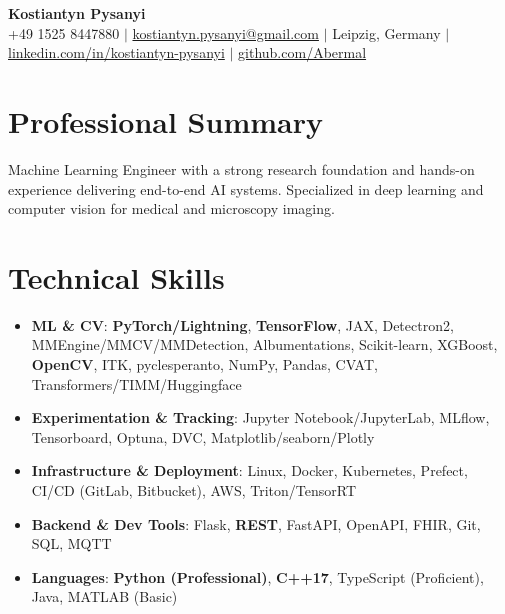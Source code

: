 \documentclass[letterpaper,10pt]{article}
\newcommand{\resumeItem}[1]{
    \item\small{#1}\vspace{-0.5pt}
}
\newcommand{\resumeSubHeadingList}{\begin{itemize}[leftmargin=0.15in, label={}]\vspace{-2pt}}
\newcommand{\resumeSubHeadingListEnd}{\end{itemize}}
\begin{document}
\begin{center}
  \textbf{\Huge Kostiantyn Pysanyi}\vspace{4pt} \\
  \small +49 1525 8447880 $|$ \href{mailto:kostiantyn.pysanyi@gmail.com}{kostiantyn.pysanyi@gmail.com} $|$ Leipzig, Germany $|$
  \href{https://www.linkedin.com/in/kostiantyn-pysanyi/}{linkedin.com/in/kostiantyn-pysanyi} $|$ \href{https://github.com/Abermal}{github.com/Abermal}
\end{center}


\section{Professional Summary}
Machine Learning Engineer with a strong research foundation and hands-on experience delivering end-to-end AI systems. Specialized in deep learning and computer vision for medical and microscopy imaging.

\section{Technical Skills}
\resumeSubHeadingList
  \resumeItem{\textbf{ML \& CV}: \textbf{PyTorch/Lightning}, \textbf{TensorFlow}, JAX, Detectron2, MMEngine/MMCV/MMDetection, Albumentations, Scikit-learn, XGBoost, \textbf{OpenCV}, ITK, pyclesperanto, NumPy, Pandas, CVAT, Transformers/TIMM/Huggingface}
  \resumeItem{\textbf{Experimentation \& Tracking}: Jupyter Notebook/JupyterLab, MLflow, Tensorboard, Optuna, DVC, Matplotlib/seaborn/Plotly}
  \resumeItem{\textbf{Infrastructure \& Deployment}: Linux, Docker, Kubernetes, Prefect, CI/CD (GitLab, Bitbucket), AWS, Triton/TensorRT}
  \resumeItem{\textbf{Backend \& Dev Tools}: Flask, \textbf{REST}, FastAPI, OpenAPI, FHIR, Git, SQL, MQTT}
  \resumeItem{\textbf{Languages}: \textbf{Python (Professional)}, \textbf{C++17}, TypeScript (Proficient), Java, MATLAB (Basic)}
\resumeSubHeadingListEnd
\end{document}
